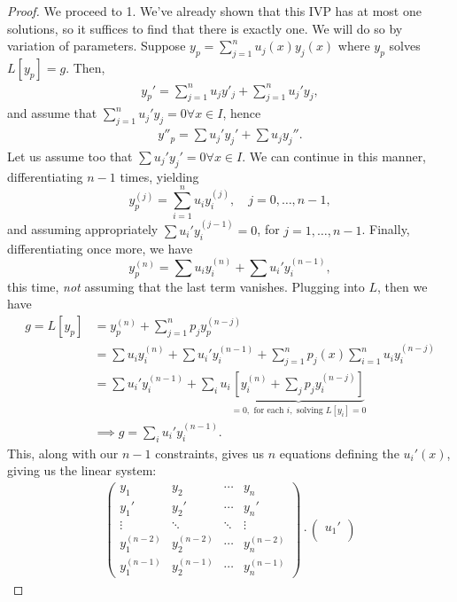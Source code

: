 \begin{proof}
    We proceed to 1. We've already shown that this IVP has at most one solutions, so it suffices to find that there is exactly one. We will do so by variation of parameters. Suppose $y_p = \sum_{j=1}^n u_j(x) y_j(x)$ where $y_p$ solves $L[y_p] = g$. Then, \begin{align*}
        y_{p}' = \sum_{j=1}^n u_j y'_j + \sum_{j=1}^n u_j' y_j,
    \end{align*}
    and assume that $\sum_{j=1}^n u_j' y_j = 0 \forall x \in I$, hence \begin{align*}
        y''_p = \sum u_j'y_j' + \sum u_j y_j''.
    \end{align*}
    Let us assume too that $\sum u_j'y_j' = 0 \forall x \in I$. We can continue in this manner, differentiating $n-1$ times, yielding \[
    y_p^{(j)}     = \sum_{i=1}^n u_i y_i^{(j)}, \quad j = 0, \dots, n - 1,
    \]
    and assuming appropriately $\sum u_i' y_i^{(j-1)} = 0$, for $j = 1, \dots, n - 1$. Finally, differentiating once more, we have \[
    y_p^{(n) }= \sum u_i y_i^{(n)} + \sum u_i' y_i^{(n-1)},    
    \]
    this time, \emph{not} assuming that the last term vanishes. Plugging into $L$, then we have \begin{align*}
    g = L[y_p] &= y_p^{(n)} + \sum_{j=1}^n p_j y_p^{(n-j)}\\
    &= \sum u_i y_i^{(n)} + \sum u_i' y_i^{(n-1)} + \sum_{j=1}^n p_j(x) \sum_{i=1}^n u_i y_i^{(n-j)}\\
    &= \sum u_i'y_i^{(n-1)} + \sum_{i} u_i \underbrace{\left[y_i^{(n)} + \sum_j p_j y_i^{(n-j)}\right]}_{= 0, \text{ for each }i, \text{ solving } L[y_i] = 0}\\
    &\implies g = \sum_i u_i' y_i^{(n-1)}.
    \end{align*}
    This, along with our $n - 1$ constraints, gives us $n$ equations  defining the $u_i'(x)$, giving us the linear system:
    \begin{align*}
        \begin{pmatrix}
            y_1 & y_2 & \cdots & y_n\\
            y_1' & y_2' & \cdots & y_n'\\
            \vdots & \ddots & \ddots & \vdots \\
            y_1^{(n-2)} & y_2^{(n-2)} & \cdots & y_n^{(n-2)}\\
            y_1^{(n-1)} & y_2^{(n-1)} & \cdots & y_n^{(n-1)}
        \end{pmatrix} \cdot \begin{pmatrix}
            u_1'\\

\end{pmatrix}
\end{align*}
\end{proof}
